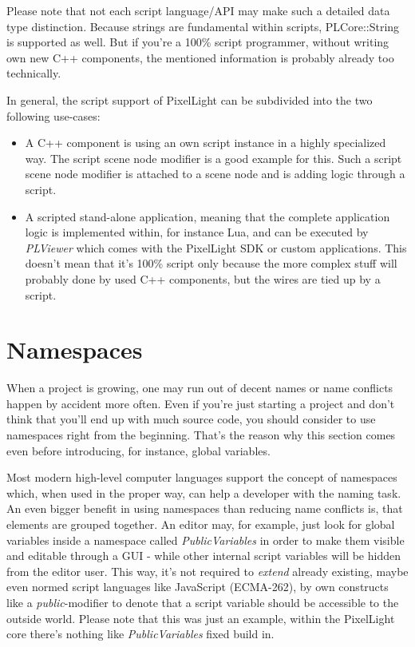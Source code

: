 Please note that not each script language/\ac{API} may make such a detailed data type distinction. Because strings are fundamental within scripts, PLCore::String is supported as well. But if you're a 100\% script programmer, without writing own new C++ components, the mentioned information is probably already too technically.

In general, the script support of PixelLight can be subdivided into the two following use-cases:
\begin{itemize}
\item{A C++ component is using an own script instance in a highly specialized way. The script scene node modifier is a good example for this. Such a script scene node modifier is attached to a scene node and is adding logic through a script.}
\item{A scripted stand-alone application, meaning that the complete application logic is implemented within, for instance Lua, and can be executed by \emph{PLViewer} which comes with the PixelLight \ac{SDK} or custom applications. This doesn't mean that it's 100\% script only because the more complex stuff will probably done by used C++ components, but the wires are tied up by a script.}
\end{itemize}




\section{Namespaces}
\label{Script_Namespaces}
When a project is growing, one may run out of decent names or name conflicts happen by accident more often. Even if you're just starting a project and don't think that you'll end up with much source code, you should consider to use namespaces right from the beginning. That's the reason why this section comes even before introducing, for instance, global variables.

Most modern high-level computer languages support the concept of namespaces which, when used in the proper way, can help a developer with the naming task. An even bigger benefit in using namespaces than reducing name conflicts is, that elements are grouped together. An editor may, for example, just look for global variables inside a namespace called \emph{PublicVariables} in order to make them visible and editable through a \ac{GUI} - while other internal script variables will be hidden from the editor user. This way, it's not required to \emph{extend} already existing, maybe even normed script languages like JavaScript (ECMA-262), by own constructs like a \emph{public}-modifier to denote that a script variable should be accessible to the outside world. Please note that this was just an example, within the PixelLight core there's nothing like \emph{PublicVariables} fixed build in.

